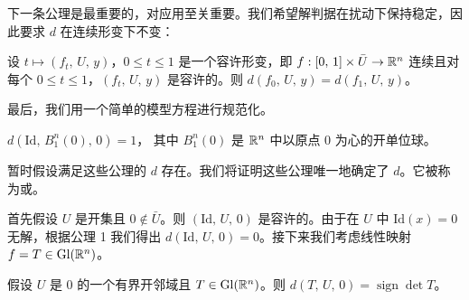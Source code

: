 下一条公理是最重要的，对应用至关重要。我们希望解判据在扰动下保持稳定，因此要求 $d$ 在连续形变下不变：

\begin{axiom}[\trHomotopy\trInvariance]\label{ax:homotopy-invariance}
设 $t\mapsto (f_t,\,U,\,y)$，$0\leq t\leq 1$ 是一个容许形变，即 $f:[0,\,1]\times\bar{U}\to\mathbb{R}^n$ 连续且对每个 $0\leq t\leq 1$，$(f_t,\,U,\,y)$ 是容许的。则
$d(f_0,\,U,\,y)=d(f_1,\,U,\,y)$。
\end{axiom}

最后，我们用一个简单的模型方程进行规范化。

\begin{axiom}[\trNormalization]\label{ax:normalization}
$d(\mathrm{Id},\,B_1^n(0),\,0)=1$，
其中 $B_1^n(0)$ 是 $\mathbb{R}^n$ 中以原点 $0$ 为心的开单位球。
\end{axiom}

暂时假设满足这些公理的 $d$ 存在。我们将证明这些公理唯一地确定了 $d$。它被称为\trBrouwer\trDegree{}或\trMapping\trDegree。

首先假设 $U$ 是开集且 $0\notin\bar{U}$。则 $(\mathrm{Id},\,U,\,0)$ 是容许的。由于在 $U$ 中 $\mathrm{Id}(x)=0$ 无解，根据公理 1 我们得出 $d(\mathrm{Id},\,U,\,0)=0$。接下来我们考虑线性映射 $f=T\in\mathrm{Gl}(\mathbb{R}^n)$。

\begin{lemma}\label{lem:brouwer-degree-linear}
假设 $U$ 是 $0$ 的一个有界开邻域且 $T\in\mathrm{Gl}(\mathbb{R}^n)$。则
$d(T,\,U,\,0)=\operatorname{sign}\det T$。
\end{lemma}

